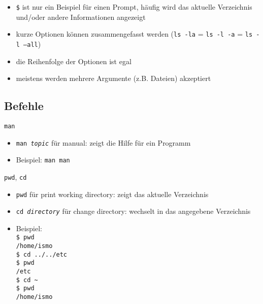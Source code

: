     \begin{frame}
      \begin{itemize}
        \item \texttt{\$} ist nur ein Beispiel für einen Prompt, häufig wird das aktuelle Verzeichnis und/oder andere Informationen angezeigt
        \item kurze Optionen können zusammengefasst werden (\texttt{ls~-la} = \texttt{ls -l -a} = \texttt{ls -l --all})
        \item die Reihenfolge der Optionen ist egal
        \item meistens werden mehrere Argumente (z.B. Dateien) akzeptiert
      \end{itemize}
    \end{frame}

  \subsection{Befehle}
    \begin{frame}{\texttt{man}}
      \begin{itemize}
        \item \texttt{man \textit{topic}} für manual: zeigt die Hilfe für ein Programm
        \item Beispiel: \texttt{man man}
      \end{itemize}
    \end{frame}

    \begin{frame}{\texttt{pwd}, \texttt{cd}}
      \begin{itemize}
        \item \texttt{pwd} für print working directory: zeigt das aktuelle Verzeichnis
        \item \texttt{cd \textit{directory}} für change directory: wechselt in das angegebene Verzeichnis
        \item Beispiel:\\
          \texttt{\$ pwd\\
                  /home/ismo\\
                  \$ cd ../../etc\\
                  \$ pwd\\
                  /etc\\
                  \$ cd \textasciitilde\\
                  \$ pwd\\
                  /home/ismo}
      \end{itemize}
    \end{frame}

